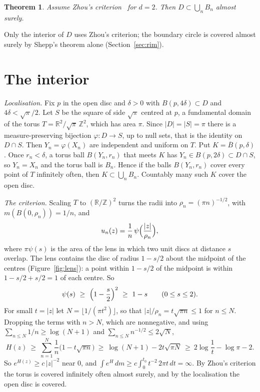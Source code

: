 \documentclass[11pt]{amsart}
\newtheorem{theorem}{Theorem}
\theoremstyle{remark}
\begin{document}
\begin{theorem}\label{thm:main}
Assume Zhou's criterion~\cite[Thm.~2.1]{Z} for $d=2$. Then $D\subset\bigcup_nB_n$ almost surely.
\end{theorem}

Only the interior of $D$ uses Zhou's criterion; the boundary circle is covered almost surely by Shepp's theorem alone (Section~\ref{sec:rim}).

\section{The interior}

\emph{Localisation.} Fix $p$ in the open disc and $\delta>0$ with $B(p,4\delta)\subset D$ and $4\delta<\sqrt\pi/2$. Let $S$ be the square of side $\sqrt\pi$ centred at $p$, a fundamental domain of the torus $T=\mathbb R^2/\sqrt\pi\,\mathbb Z^2$, which has area $\pi$. Since $|D|=|S|=\pi$ there is a measure-preserving bijection $\varphi:D\to S$, up to null sets, that is the identity on $D\cap S$. Then $Y_n=\varphi(X_n)$ are independent and uniform on $T$. Put $K=\overline B(p,\delta)$. Once $r_n<\delta$, a torus ball $B(Y_n,r_n)$ that meets $K$ has $Y_n\in B(p,2\delta)\subset D\cap S$, so $Y_n=X_n$ and the torus ball is $B_n$. Hence if the balls $B(Y_n,r_n)$ cover every point of $T$ infinitely often, then $K\subset\bigcup_nB_n$. Countably many such $K$ cover the open disc.

\emph{The criterion.} Scaling $T$ to $(\mathbb R/\mathbb Z)^2$ turns the radii into $\rho_n=(\pi n)^{-1/2}$, with $m(B(0,\rho_n))=1/n$, and
\[
u_n(z)=\frac1n\,\psi\Bigl(\frac{|z|}{\rho_n}\Bigr),
\]
where $\pi\psi(s)$ is the area of the lens in which two unit discs at distance $s$ overlap. The lens contains the disc of radius $1-s/2$ about the midpoint of the centres (Figure~\ref{fig:lens}): a point within $1-s/2$ of the midpoint is within $1-s/2+s/2=1$ of each centre. So
\begin{equation}\label{eq:lens}
\psi(s)\ \ge\ \Bigl(1-\frac s2\Bigr)^2\ \ge\ 1-s\qquad(0\le s\le2).
\end{equation}
For small $t=|z|$ let $N=\lfloor1/(\pi t^2)\rfloor$, so that $|z|/\rho_n=t\sqrt{\pi n}\le1$ for $n\le N$. Dropping the terms with $n>N$, which are nonnegative, and using $\sum_{n\le N}1/n\ge\log(N+1)$ and $\sum_{n\le N}n^{-1/2}\le2\sqrt N$,
\[
H(z)\ \ge\ \sum_{n=1}^N\frac1n\bigl(1-t\sqrt{\pi n}\bigr)\ \ge\ \log(N+1)-2t\sqrt{\pi N}\ \ge\ 2\log\frac1t-\log\pi-2 .
\]
So $e^{H(z)}\ge c\,|z|^{-2}$ near $0$, and $\int e^H\,dm\ge c\int_0^{t_0}t^{-2}\,2\pi t\,dt=\infty$. By Zhou's criterion the torus is covered infinitely often almost surely, and by the localisation the open disc is covered.
\end{document}
